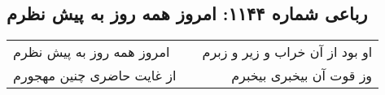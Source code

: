 \begin{center}
\section*{رباعی شماره ۱۱۴۴: امروز همه روز به پیش نظرم}
\label{sec:1144}
\begin{longtable}{l p{0.5cm} r}
امروز همه روز به پیش نظرم
&&
او بود از آن خراب و زیر و زبرم
\\
از غایت حاضری چنین مهجورم
&&
وز قوت آن بیخبری بیخبرم
\\
\end{longtable}
\end{center}
